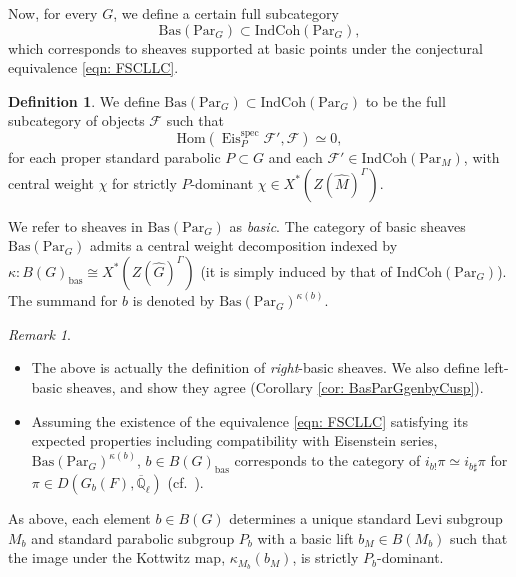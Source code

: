 \documentclass{amsart}
\theoremstyle{definition}
\newtheorem{definition}[theorem]{Definition}
\theoremstyle{remark}
\newtheorem{remark}[theorem]{Remark}
\numberwithin{equation}{section}
\newcommand{\ov}{\overline}
\newcommand{\mc}{\mathcal}
\newcommand{\Q}{\mathbb{Q}}
\newcommand{\bas}{\mathrm{bas}}
\newcommand{\Hom}{\mathrm{Hom}}
\newcommand{\spec}{\mathrm{spec}}
\newcommand{\wh}{\widehat}
\newcommand{\Par}{\mathrm{Par}}
\newcommand{\IndCoh}{\mathrm{IndCoh}}
\DeclareMathOperator{\Eis}{\mathrm{Eis}}
\newcommand{\Bas}{\mathrm{Bas}}
\begin{document}
Now, for every $G$, we define a certain full subcategory
\[
\Bas(\Par_G) \subset \IndCoh(\Par_G), 
\]
which corresponds to sheaves supported at basic points under the conjectural equivalence \eqref{eqn: FSCLLC}. 

\begin{definition}
   We define $\Bas(\Par_G) \subset \IndCoh(\Par_G)$ to be the full subcategory of objects $\mc{F}$ such that
    \begin{equation*}
       \Hom(\Eis^{\spec}_{P} \mc{F}', \mc{F})\simeq 0,
       \end{equation*}
       for each proper standard parabolic $P \subset G$ and each $\mc{F}' \in \IndCoh(\Par_M)$, with central weight $\chi$ for strictly $P$-dominant $\chi \in X^*(Z(\wh{M})^{\Gamma})$.

       We refer to sheaves in $\Bas(\Par_G)$ as \emph{basic}. The category of basic sheaves $\Bas(\Par_G)$ admits a central weight decomposition indexed by $\kappa\colon B(G)_{\bas} \cong X^* (Z(\wh G)^\Gamma) $ (it is simply induced by that of $\IndCoh(\Par_G)$). The summand for $b$ is denoted by $\Bas(\Par_G)^{\kappa(b)}$. 
\end{definition}
\begin{remark}
\leavevmode
\begin{itemize}
    \item The above is actually the definition of \emph{right}-basic sheaves. We also define left-basic sheaves, and show they agree (Corollary \ref{cor: BasParGgenbyCusp}).
    \item Assuming the existence of the equivalence \eqref{eqn: FSCLLC} satisfying its expected properties including compatibility with Eisenstein series, $\Bas(\Par_G)^{\kappa(b)}$, $b\in B(G)_{\bas}$ corresponds to the category of $i_{b!} \pi \simeq i_{b\sharp} \pi$ for $\pi \in D(G_b(F), \ov{\Q}_{\ell})$ (cf.~\cite[Proposition 6.7.3]{HansenMann}).
\end{itemize}
\end{remark}

As above, each element $b\in B(G)$ determines a unique standard Levi subgroup $M_b$ and standard parabolic subgroup $P_b$ with a basic lift $b_M \in B(M_b)$ such that the image under the Kottwitz map, $\kappa_{M_b}(b_M)$, is strictly $P_b$-dominant. 
\end{document}

